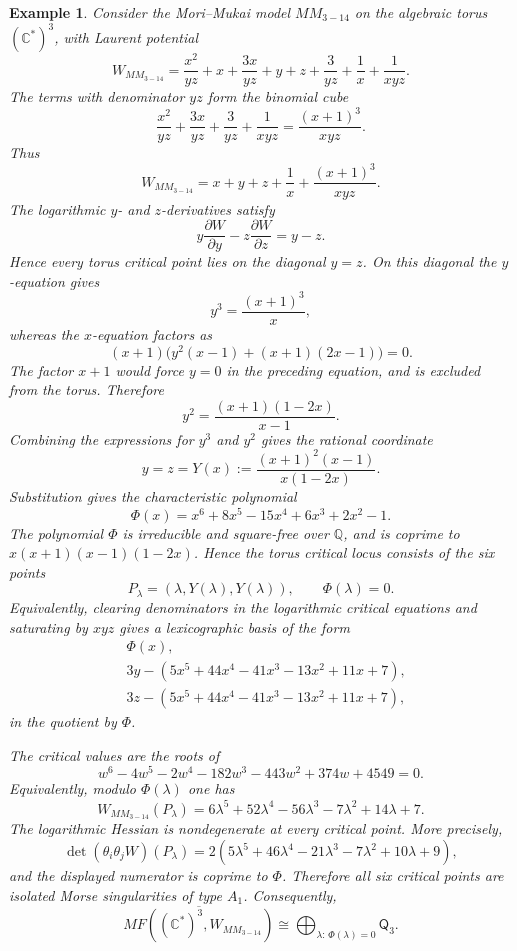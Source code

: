 \documentclass[11pt]{amsart}
\newtheorem{example}{Example}[section]
\newcommand{\MorseCat}[1]{\mathsf{Q}_{#1}}
\begin{document}
\begin{example}
Consider the Mori--Mukai model $MM_{3-14}$ on the algebraic torus
$(\mathbb{C}^*)^3$, with Laurent potential
\[
W_{MM_{3-14}}=\frac{x^2}{yz}+x+\frac{3x}{yz}+y+z
+\frac{3}{yz}+\frac{1}{x}+\frac{1}{xyz}.
\]
The terms with denominator $yz$ form the binomial cube
\[
\frac{x^2}{yz}+\frac{3x}{yz}+\frac{3}{yz}+\frac{1}{xyz}
=\frac{(x+1)^3}{xyz}.
\]
Thus
\[
W_{MM_{3-14}}=x+y+z+\frac{1}{x}+\frac{(x+1)^3}{xyz}.
\]
The logarithmic $y$- and $z$-derivatives satisfy
\[
y\frac{\partial W}{\partial y}-z\frac{\partial W}{\partial z}=y-z.
\]
Hence every torus critical point lies on the diagonal $y=z$. On this diagonal
the $y$-equation gives
\[
y^3=\frac{(x+1)^3}{x},
\]
whereas the $x$-equation factors as
\[
(x+1)\bigl(y^2(x-1)+(x+1)(2x-1)\bigr)=0.
\]
The factor $x+1$ would force $y=0$ in the preceding equation, and is excluded
from the torus. Therefore
\[
y^2=\frac{(x+1)(1-2x)}{x-1}.
\]
Combining the expressions for $y^3$ and $y^2$ gives the rational coordinate
\[
y=z=Y(x):=\frac{(x+1)^2(x-1)}{x(1-2x)}.
\]
Substitution gives the characteristic polynomial
\[
\Phi(x)=x^6+8x^5-15x^4+6x^3+2x^2-1.
\]
The polynomial $\Phi$ is irreducible and square-free over $\mathbb{Q}$, and
is coprime to $x(x+1)(x-1)(1-2x)$. Hence the torus critical locus consists of
the six points
\[
P_\lambda=(\lambda,Y(\lambda),Y(\lambda)),
\qquad
\Phi(\lambda)=0.
\]
Equivalently, clearing denominators in the logarithmic critical equations and
saturating by $xyz$ gives a lexicographic basis of the form
\[
\begin{aligned}
&\Phi(x),\\
&3y-(5x^5+44x^4-41x^3-13x^2+11x+7),\\
&3z-(5x^5+44x^4-41x^3-13x^2+11x+7),
\end{aligned}
\]
in the quotient by $\Phi$.

The critical values are the roots of
\[
w^6-4w^5-2w^4-182w^3-443w^2+374w+4549=0.
\]
Equivalently, modulo $\Phi(\lambda)$ one has
\[
W_{MM_{3-14}}(P_\lambda)=
6\lambda^5+52\lambda^4-56\lambda^3-7\lambda^2+14\lambda+7.
\]
The logarithmic Hessian is nondegenerate at every critical point. More
precisely,
\[
\det(\theta_i\theta_jW)(P_\lambda)
=2(5\lambda^5+46\lambda^4-21\lambda^3-7\lambda^2+10\lambda+9),
\]
and the displayed numerator is coprime to $\Phi$. Therefore all six critical
points are isolated Morse singularities of type $A_1$. Consequently,
\[
\overline{MF((\mathbb{C}^*)^3,W_{MM_{3-14}})}
\cong \bigoplus_{\lambda:\,\Phi(\lambda)=0}\MorseCat{3}.
\]
\end{example}
\end{document}

